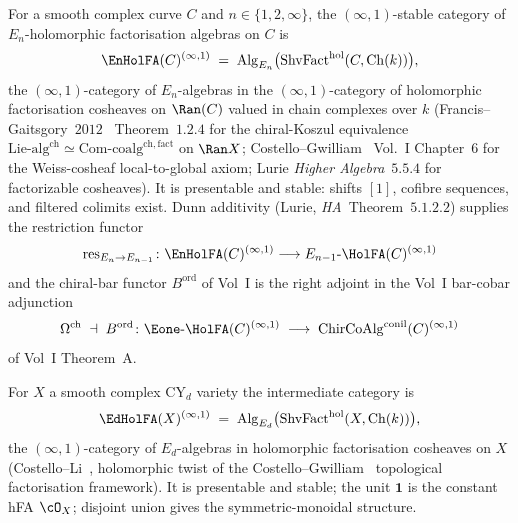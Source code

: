 \begin{definition}
\label{def:en-hol-fa-infty}
For a smooth complex curve $C$ and $n \in \{1, 2, \infty\}$, the $(\infty,1)$-stable category of $E_n$-holomorphic factorisation algebras on $C$ is
\[
 \EnHolFA(C)^{(\infty,1)} \;=\; \mathrm{Alg}_{E_n}\bigl(\mathrm{ShvFact}^{\mathrm{hol}}(C, \mathrm{Ch}(k))\bigr),
\]
the $(\infty,1)$-category of $E_n$-algebras in the $(\infty,1)$-category of holomorphic factorisation cosheaves on $\Ran(C)$ valued in chain complexes over $k$ (Francis--Gaitsgory~$2012$~\cite{FrancisGaitsgory2012} Theorem~$1.2.4$ for the chiral-Koszul equivalence $\mathrm{Lie}\text{-alg}^{\mathrm{ch}} \simeq \mathrm{Com}\text{-coalg}^{\mathrm{ch,fact}}$ on $\Ran X$; Costello--Gwilliam~\cite{CostelloGwilliam} Vol.~I Chapter~$6$ for the Weiss-cosheaf local-to-global axiom; Lurie \textit{Higher Algebra}~$5.5.4$ for factorizable cosheaves). It is presentable and stable: shifts $[1]$, cofibre sequences, and filtered colimits exist. Dunn additivity (Lurie, \textit{HA}~Theorem~$5.1.2.2$) supplies the restriction functor
\[
 \mathrm{res}_{E_n \to E_{n-1}} \colon \EnHolFA(C)^{(\infty,1)} \longrightarrow E_{n-1}\text{-}\HolFA(C)^{(\infty,1)}
\]
and the chiral-bar functor $B^{\mathrm{ord}}$ of Vol~I is the right adjoint in the Vol~I bar-cobar adjunction
\[
 \Omega^{\mathrm{ch}} \;\dashv\; B^{\mathrm{ord}} \colon \Eone\text{-}\HolFA(C)^{(\infty,1)} \;\longrightarrow\; \mathrm{ChirCoAlg}^{\mathrm{conil}}(C)^{(\infty,1)}
\]
of Vol~I Theorem~A.
\end{definition}

\begin{definition}
\label{def:ed-hol-fa-infty}
For $X$ a smooth complex CY$_d$ variety the intermediate category is
\[
 \EdHolFA(X)^{(\infty,1)} \;=\; \mathrm{Alg}_{E_d}\bigl(\mathrm{ShvFact}^{\mathrm{hol}}(X, \mathrm{Ch}(k))\bigr),
\]
the $(\infty,1)$-category of $E_d$-algebras in holomorphic factorisation cosheaves on $X$ (Costello--Li~\cite{CostelloLi2016,CostelloLi2020}, holomorphic twist of the Costello--Gwilliam~\cite{CostelloGwilliam2017} topological factorisation framework). It is presentable and stable; the unit $\mathbf{1}$ is the constant hFA $\cO_X$; disjoint union gives the symmetric-monoidal structure.
\end{definition}


